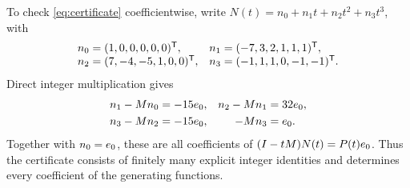 To check \eqref{eq:certificate} coefficientwise, write
$N(t)=n_0+n_1t+n_2t^2+n_3t^3$, with
\[
\begin{array}{ll}
n_0=(1,0,0,0,0,0)^{\mathsf T},&
n_1=(-7,3,2,1,1,1)^{\mathsf T},\\
n_2=(7,-4,-5,1,0,0)^{\mathsf T},&
n_3=(-1,1,1,0,-1,-1)^{\mathsf T}.
\end{array}
\]
Direct integer multiplication gives
\[
\begin{aligned}
n_1-Mn_0&=-15e_0,&
n_2-Mn_1&=32e_0,\\
n_3-Mn_2&=-15e_0,&
-Mn_3&=e_0.
\end{aligned}
\]
Together with $n_0=e_0$, these are all coefficients of
$(I-tM)N(t)=P(t)e_0$.
Thus the certificate consists of finitely many explicit
integer identities and determines every coefficient of
the generating functions.
